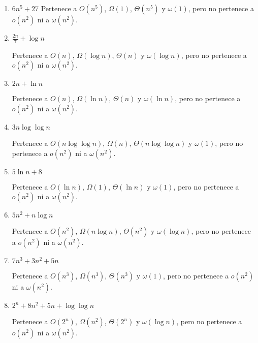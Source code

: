 \begin{enumerate}
	\item $6n^5 + 27$
	      Pertenece a $O(n^5)$, $\Omega(1)$, $\Theta(n^5)$ y $\omega(1)$, pero no pertenece a $o(n^2)$ ni a $\omega(n^2)$.

	\item $\frac{2n}{7} + \log n$

	      Pertenece a $O(n)$, $\Omega(\log n)$, $\Theta(n)$ y $\omega(\log n)$, pero no pertenece a $o(n^2)$ ni a $\omega(n^2)$.

	\item $2n + \ln n$

	      Pertenece a $O(n)$, $\Omega(\ln n)$, $\Theta(n)$ y $\omega(\ln n)$, pero no pertenece a $o(n^2)$ ni a $\omega(n^2)$.

	\item $3n \log \log n$

	      Pertenece a $O(n \log \log n)$, $\Omega(n)$, $\Theta(n \log \log n)$ y $\omega(1)$, pero no pertenece a $o(n^2)$ ni a $\omega(n^2)$.

	\item $5 \ln n + 8$

	      Pertenece a $O(\ln n)$, $\Omega(1)$, $\Theta(\ln n)$ y $\omega(1)$, pero no pertenece a $o(n^2)$ ni a $\omega(n^2)$.

	\item $5n^2 + n \log n$

	      Pertenece a $O(n^2)$, $\Omega(n \log n)$, $\Theta(n^2)$ y $\omega(\log n)$, pero no pertenece a $o(n^2)$ ni a $\omega(n^2)$.

	\item $7n^3 + 3n^2 + 5n$

	      Pertenece a $O(n^3)$, $\Omega(n^3)$, $\Theta(n^3)$ y $\omega(1)$, pero no pertenece a $o(n^2)$ ni a $\omega(n^2)$.

	\item $2^n + 8n^2 + 5n + \log \log n$

	      Pertenece a $O(2^n)$, $\Omega(n^2)$, $\Theta(2^n)$ y $\omega(\log n)$, pero no pertenece a $o(n^2)$ ni a $\omega(n^2)$.
\end{enumerate}

